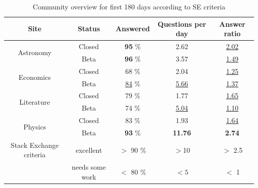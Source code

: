 \begin{table}[h!]
	\caption{Community overview for first 180 days according to SE criteria  }
	
	\label{tab:se_c}
	\begin{tabular}{ccccc}
		\hline
		
		Site & Status &  Answered & Questions per day & Answer ratio \\ \hline
		\multirow{2}{*}{Astronomy} & \multicolumn{1}{c|}{Closed} & \multicolumn{1}{c|}{\textbf{95} \%}  & \multicolumn{1}{c|}{2.62} & \multicolumn{1}{c}{\underline{2.02}} \\
		& \multicolumn{1}{c|}{Beta} & \multicolumn{1}{c|}{\textbf{96} \%}  & \multicolumn{1}{c|}{3.57} & \multicolumn{1}{c}{\underline{1.49}} \\ \hline
		\multirow{2}{*}{Economics} & \multicolumn{1}{c|}{Closed} & \multicolumn{1}{c|}{68 \%}  & \multicolumn{1}{c|}{2.04} & \multicolumn{1}{c}{\underline{1.25}} \\
		& \multicolumn{1}{c|}{Beta} & \multicolumn{1}{c|}{\underline{84} \%}  & \multicolumn{1}{c|}{\underline{5.66}} & \multicolumn{1}{c}{\underline{1.37}} \\ \hline
		\multirow{2}{*}{Literature} & \multicolumn{1}{c|}{Closed} & \multicolumn{1}{c|}{79 \%}  & \multicolumn{1}{c|}{1.77} & \multicolumn{1}{c}{\underline{1.65}} \\
		& \multicolumn{1}{c|}{Beta} & \multicolumn{1}{c|}{74 \%}  & \multicolumn{1}{c|}{\underline{5.04}} & \multicolumn{1}{c}{\underline{1.10}} \\ \hline
		\multirow{2}{*}{Physics} & \multicolumn{1}{c|}{Closed} & \multicolumn{1}{c|}{83 \%}  & \multicolumn{1}{c|}{1.93} & \multicolumn{1}{c}{\underline{1.64}} \\
		& \multicolumn{1}{c|}{Beta} & \multicolumn{1}{c|}{\textbf{93} \%}  & \multicolumn{1}{c|}{\textbf{11.76}} & \multicolumn{1}{c}{ \textbf{2.74}} \\ \hline \hline
		{Stack Exchange criteria} & excellent & $>$ 90 \% & $>$10 & $>$ 2.5   \\
		& needs some work & $<$ 80 \% & $<5$ & $<$ 1   \\ \hline
		
		
	\end{tabular}
	
\end{table}

       
